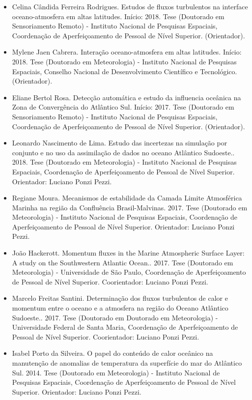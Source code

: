 \documentclass[11pt, a4paper]{awesome-cv}
\begin{document}
\begin{cvletter}
\begin{itemize}
  \item[] Celina Cândida Ferreira Rodrigues. Estudos de fluxos turbulentos na interface oceano-atmosfera em altas latitudes. Início: 2018. Tese (Doutorado em Sensoriamento Remoto) - Instituto Nacional de Pesquisas Espaciais, Coordenação de Aperfeiçoamento de Pessoal de Nível Superior. (Orientador). 
  \item[] Mylene Jaen Cabrera. Interação oceano-atmosfera em altas latitudes. Início: 2018. Tese (Doutorado em Meteorologia) - Instituto Nacional de Pesquisas Espaciais, Conselho Nacional de Desenvolvimento Científico e Tecnológico. (Orientador). 
  \item[] Eliane Bertol Rosa. Detecção automática e estudo da influencia oceânica na Zona de Convergência do Atlântico Sul. Início: 2017. Tese (Doutorado em Sensoriamento Remoto) - Instituto Nacional de Pesquisas Espaciais, Coordenação de Aperfeiçoamento de Pessoal de Nível Superior. (Orientador). 
  \item[] Leonardo Nascimento de Lima. Estudo das incertezas na simulação por conjunto e no uso da assimilação de dados no oceano Atlântico Sudoeste.. 2018. Tese (Doutorado em Meteorologia) - Instituto Nacional de Pesquisas Espaciais, Coordenação de Aperfeiçoamento de Pessoal de Nível Superior. Orientador: Luciano Ponzi Pezzi. 
  \item[] Regiane Moura. Mecanismos de estabilidade da Camada Limite Atmosférica Marinha na região da Confluência Brasil-Malvinas. 2017. Tese (Doutorado em Meteorologia) - Instituto Nacional de Pesquisas Espaciais, Coordenação de Aperfeiçoamento de Pessoal de Nível Superior. Orientador: Luciano Ponzi Pezzi. 
  \item[] João Hackerott. Momentum fluxes in the Marine Atmospheric Surface Layer: A study on the Southwestern Atlantic Ocean.. 2017. Tese (Doutorado em Meteorologia) - Universidade de São Paulo, Coordenação de Aperfeiçoamento de Pessoal de Nível Superior. Coorientador: Luciano Ponzi Pezzi.
  \item[] Marcelo Freitas Santini. Determinação dos fluxos turbulentos de calor e momentum entre o oceano e a atmosfera na região do Oceano Atlântico Sudoeste.. 2017. Tese (Doutorado em Doutorado em Meteorologia) - Universidade Federal de Santa Maria, Coordenação de Aperfeiçoamento de Pessoal de Nível Superior. Coorientador: Luciano Ponzi Pezzi. 
  \item[] Isabel Porto da Silveira. O papel do conteúdo de calor oceânico na manutenção de anomalias de temperatura da superfície do mar do Atlântico Sul. 2014. Tese (Doutorado em Meteorologia) - Instituto Nacional de Pesquisas Espaciais, Coordenação de Aperfeiçoamento de Pessoal de Nível Superior. Orientador: Luciano Ponzi Pezzi. 

\end{itemize}
\end{cvletter}
\end{document}
